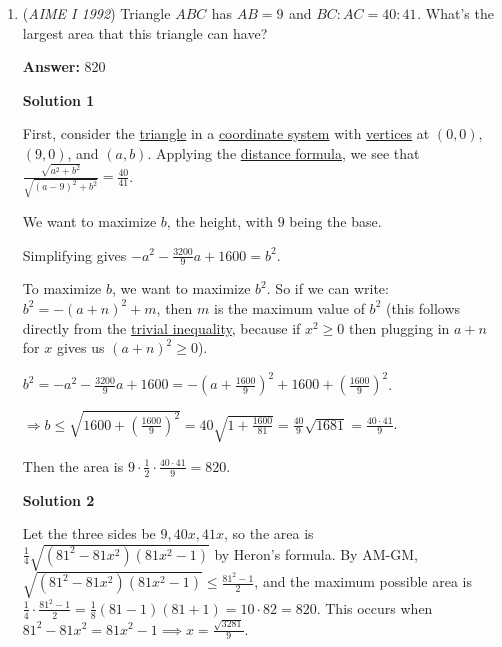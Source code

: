 \begin{enumerate}
 


	\item (\textit{AIME I 1992}) Triangle $ABC^{}_{}$ has $AB=9^{}_{}$ and $BC: AC=40: 41^{}_{}$. What's the largest area that this triangle can have?


 
 \textbf{Answer: }820



\textbf{Solution 1}

First, consider the \href{https://artofproblemsolving.com/wiki/index.php?title=Triangle}{triangle} in a \href{https://artofproblemsolving.com/wiki/index.php?title=Coordinate\_system}{coordinate system} with \href{https://artofproblemsolving.com/wiki/index.php?title=Vertex}{vertices} at $(0,0)$, $(9,0)$, and $(a,b)$. Applying the \href{https://artofproblemsolving.com/wiki/index.php?title=Distance\_formula}{distance formula}, we see that $\frac{ \sqrt{a^2 + b^2} }{ \sqrt{ (a-9)^2 + b^2 } } = \frac{40}{41}$.

 We want to maximize $b$, the height, with $9$ being the base.

 Simplifying gives $-a^2 -\frac{3200}{9}a +1600 = b^2$.

 To maximize $b$, we want to maximize $b^2$. So if we can write: $b^2=-(a+n)^2+m$, then $m$ is the maximum value of $b^2$ (this follows directly from the \href{https://artofproblemsolving.com/wiki/index.php?title=Trivial\_inequality}{trivial inequality}, because if ${x^2 \ge 0}$ then plugging in $a+n$ for $x$ gives us ${(a+n)^2 \ge 0}$).

 $b^2=-a^2 -\frac{3200}{9}a +1600=-\left(a +\frac{1600}{9}\right)^2 +1600+\left(\frac{1600}{9}\right)^2$.

 $\Rightarrow b\le\sqrt{1600+\left(\frac{1600}{9}\right)^2}=40\sqrt{1+\frac{1600}{81}}=\frac{40}{9}\sqrt{1681}=\frac{40\cdot 41}{9}$.

 Then the area is $9\cdot\frac{1}{2} \cdot \frac{40\cdot 41}{9} = \boxed{820}$.

 



\textbf{Solution 2}

Let the three sides be $9,40x,41x$, so the area is $\frac14\sqrt {(81^2 - 81x^2)(81x^2 - 1)}$ by Heron's formula. By AM-GM, $\sqrt {(81^2 - 81x^2)(81x^2 - 1)}\le\frac {81^2 - 1}2$, and the maximum possible area is $\frac14\cdot\frac {81^2 - 1}2 = \frac18(81 - 1)(81 + 1) = 10\cdot82 = \boxed{820}$. This occurs when $81^2 - 81x^2 = 81x^2 - 1\implies x = \frac {\sqrt {3281}}9$.


\end{enumerate}
